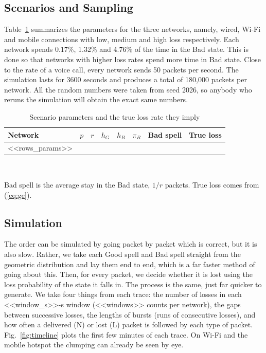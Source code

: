 \documentclass[conference]{IEEEtran}
\begin{document}
\subsection{Scenarios and Sampling}
Table~\ref{tab:params} summarizes the parameters for the three networks, namely, wired, Wi-Fi and mobile connections with low, medium and high loss respectively. Each network spends 0.17\%, 1.32\% and 4.76\% of the time in the Bad state. This is done so that networks with higher loss rates spend more time in Bad state. Close to the rate of a voice call, every network sends 50 packets per second. The simulation lasts for 3600 seconds and produces a total of 180,000 packets per network. All the random numbers were taken from seed 2026, so anybody who reruns the simulation will obtain the exact same numbers.

\begin{table}[!t]
\caption{Scenario parameters and the true loss rate they imply}
\label{tab:params}
\centering
\footnotesize
\setlength{\tabcolsep}{3.2pt}
\begin{tabular}{lccccccc}
\toprule
Network & $p$ & $r$ & $h_G$ & $h_B$ & $\pi_B$ & Bad spell & True loss \\
\midrule
<<rows_params>>
\bottomrule
\end{tabular}
\\[2pt]
\raggedright\scriptsize Bad spell is the average stay in the Bad state, $1/r$ packets. True loss comes from (\ref{eq:ge}).
\end{table}

\subsection{Simulation}
The order can be simulated by going packet by packet which is correct, but it is also slow. Rather, we take each Good spell and Bad spell straight from the geometric distribution and lay them end to end, which is a far faster method of going about this. Then, for every packet, we decide whether it is lost using the loss probability of the state it falls in. The process is the same, just far quicker to generate. We take four things from each trace: the number of losses in each <<window_s>>-s window (<<windows>> counts per network), the gaps between successive losses, the lengths of bursts (runs of consecutive losses), and how often a delivered (N) or lost (L) packet is followed by each type of packet. Fig.~\ref{fig:timeline} plots the first few minutes of each trace. On Wi-Fi and the mobile hotspot the clumping can already be seen by eye.
\end{document}
